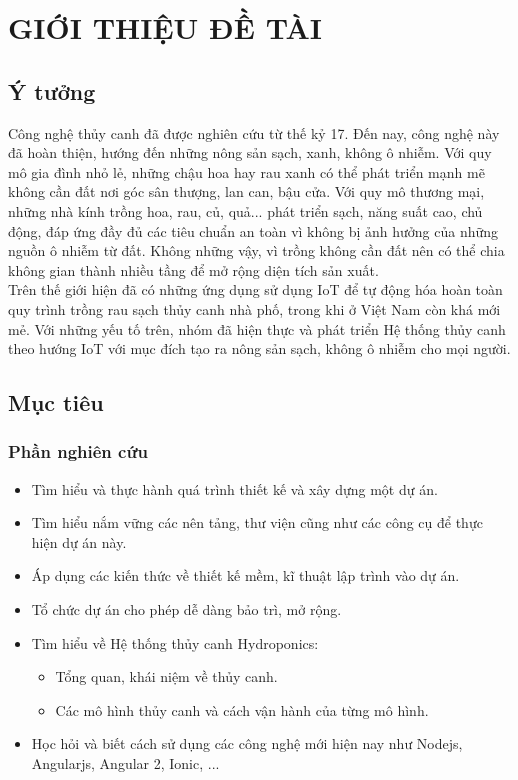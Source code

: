 \documentclass[a4paper,12pt,oneside]{article}
\begin{document}
\newpage
{}
\section{GIỚI THIỆU ĐỀ TÀI}

\subsection{Ý tưởng}

\noindent Công nghệ thủy canh đã được nghiên cứu từ thế kỷ 17. Đến nay, công nghệ này đã hoàn thiện, hướng đến những nông sản sạch, xanh, không ô nhiễm. Với quy mô gia đình nhỏ lẻ, những chậu hoa hay rau xanh có thể phát triển mạnh mẽ không cần đất nơi góc sân thượng, lan can, bậu cửa. Với quy mô thương mại, những nhà kính trồng hoa, rau, củ, quả...  phát triển sạch, năng suất cao, chủ động, đáp ứng đầy đủ các tiêu chuẩn an toàn vì không bị ảnh hưởng của những nguồn ô nhiễm từ đất. Không những vậy, vì trồng không cần đất nên có thể chia không gian thành nhiều tầng để mở rộng diện tích sản xuất.\\

\noindent Trên thế giới hiện đã có những ứng dụng sử dụng IoT để tự động hóa hoàn toàn quy trình trồng rau sạch thủy canh nhà phố, trong khi ở Việt Nam còn khá mới mẻ. Với những yếu tố trên, nhóm đã hiện thực và phát triển Hệ thống thủy canh theo hướng IoT với mục đích tạo ra nông sản sạch, không ô nhiễm cho mọi người.


\subsection{Mục tiêu}
\subsubsection{Phần nghiên cứu}
\begin{itemize}
\item Tìm hiểu và thực hành quá trình thiết kế và xây dựng một dự án.
\item Tìm hiểu nắm vững các nên tảng, thư viện cũng như các công cụ để thực hiện dự án này.
\item Áp dụng các kiến thức về thiết kế mềm, kĩ thuật lập trình vào dự án.
\item Tổ chức dự án cho phép dễ dàng bảo trì, mở rộng.
\item Tìm hiểu về Hệ thống thủy canh Hydroponics: 
	\begin{itemize}
	\item Tổng quan, khái niệm về thủy canh.
	\item Các mô hình thủy canh và cách vận hành của từng mô hình.
	\end{itemize}
\item Học hỏi và biết cách sử dụng các công nghệ mới hiện nay như Nodejs, Angularjs, Angular 2, Ionic, ...
\end{itemize}
\end{document}

